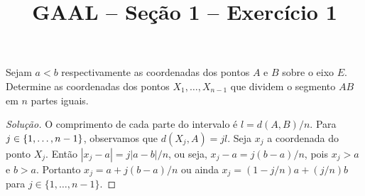 \documentclass[a4paper,11pt]{article}
\title{GAAL -- Seção 1 -- Exercício 1}
\author{\empty}
\date{\empty}
\newcommand\onlyinsubfileone\maketitle
\begin{document}
\onlyinsubfileone

\begin{exercicio-gaal}[E1.S1]
  Sejam $a < b$ respectivamente as coordenadas dos pontos $A$ e $B$ sobre o eixo $E$.
  Determine as coordenadas dos pontos $X_1, \dots, X_{n-1}$ que dividem o segmento $AB$ em $n$ partes iguais.
\end{exercicio-gaal}

\begin{proof}[Solução]
  O comprimento de cada parte do intervalo é $l = d(A,B)/n$.
  Para $j \in \{1, \dots, n-1\}$, observamos que $d(X_j,A) = j l$.
  Seja $x_j$ a coordenada do ponto $X_j$.
  Então $|x_j - a| = j|a-b|/n$, ou seja, $x_j - a = j(b-a)/n$, pois $x_j > a$ e $b > a$.
  Portanto $x_j = a + j(b-a)/n$ ou ainda $x_j = (1-j/n)a + (j/n)b$ para $j \in \{1, \dots, n-1 \}$.
\end{proof}
\end{document}

